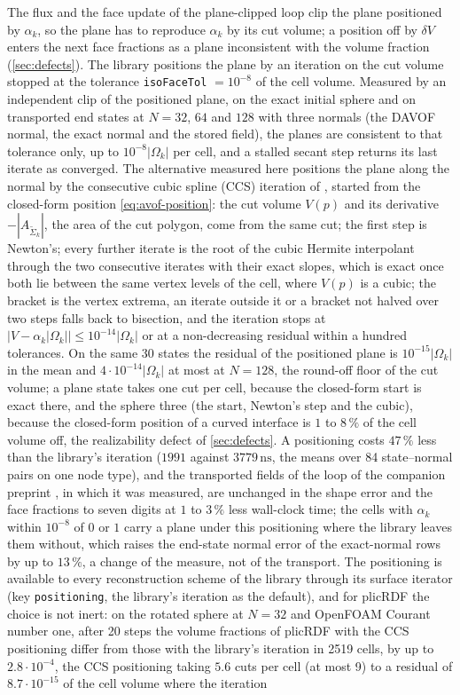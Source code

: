 \documentclass[preprint,12pt]{elsarticle}
\newcommand{\ASk}{A_{\tilde{\Sigma}_k}}
\begin{document}
The flux and the face update of the plane-clipped loop clip the plane positioned by $\alpha_k$, so the plane has to reproduce $\alpha_k$ by its cut volume; a position off by $\delta V$ enters the next face fractions as a plane inconsistent with the volume fraction (\cref{sec:defects}). The library positions the plane by an iteration on the cut volume stopped at the tolerance \texttt{isoFaceTol} $= 10^{-8}$ of the cell volume. Measured by an independent clip of the positioned plane, on the exact initial sphere and on transported end states at $N = 32$, $64$ and $128$ with three normals (the DAVOF normal, the exact normal and the stored field), the planes are consistent to that tolerance only, up to $10^{-8}|\Omega_k|$ per cell, and a stalled secant step returns its last iterate as converged. The alternative measured here positions the plane along the normal by the consecutive cubic spline (CCS) iteration of \citet{Maric2021CCS}, started from the closed-form position \cref{eq:avof-position}: the cut volume $V(p)$ and its derivative $-|\ASk|$, the area of the cut polygon, come from the same cut; the first step is Newton's; every further iterate is the root of the cubic Hermite interpolant through the two consecutive iterates with their exact slopes, which is exact once both lie between the same vertex levels of the cell, where $V(p)$ is a cubic; the bracket is the vertex extrema, an iterate outside it or a bracket not halved over two steps falls back to bisection, and the iteration stops at $|V - \alpha_k|\Omega_k|| \le 10^{-14}|\Omega_k|$ or at a non-decreasing residual within a hundred tolerances. On the same 30 states the residual of the positioned plane is $10^{-15}|\Omega_k|$ in the mean and $4\cdot10^{-14}|\Omega_k|$ at most at $N = 128$, the round-off floor of the cut volume; a plane state takes one cut per cell, because the closed-form start is exact there, and the sphere three (the start, Newton's step and the cubic), because the closed-form position of a curved interface is $1$ to $8\,\%$ of the cell volume off, the realizability defect of \cref{sec:defects}. A positioning costs $47\,\%$ less than the library's iteration ($1991$ against $3779\,\mathrm{ns}$, the means over 84 state--normal pairs on one node type), and the transported fields of the loop of the companion preprint \citep{MaricSweptAdvection2026}, in which it was measured, are unchanged in the shape error and the face fractions to seven digits at $1$ to $3\,\%$ less wall-clock time; the cells with $\alpha_k$ within $10^{-8}$ of $0$ or $1$ carry a plane under this positioning where the library leaves them without, which raises the end-state normal error of the exact-normal rows by up to $13\,\%$, a change of the measure, not of the transport. The positioning is available to every reconstruction scheme of the library through its surface iterator (key \texttt{positioning}, the library's iteration as the default), and for plicRDF the choice is not inert: on the rotated sphere at $N = 32$ and OpenFOAM Courant number one, after 20 steps the volume fractions of plicRDF with the CCS positioning differ from those with the library's iteration in 2519 cells, by up to $2.8\cdot10^{-4}$, the CCS positioning taking $5.6$ cuts per cell (at most 9) to a residual of $8.7\cdot10^{-15}$ of the cell volume where the iteration 
\end{document}
